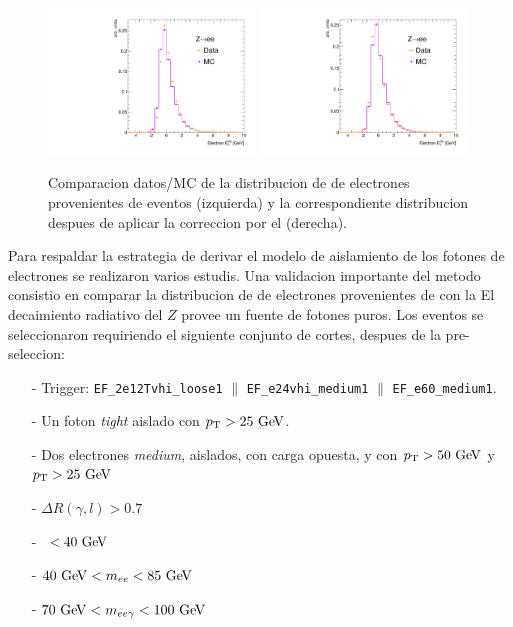 \begin{figure}[h]
  \centering
  \includegraphics[width=0.49\textwidth]{figures/electron_iso_Zee_raw}
  \includegraphics[width=0.49\textwidth]{figures/electron_iso_Zee_corr}
  \caption{Comparacion datos/MC de la distribucion de {\etiso} de electrones provenientes de
    eventos {\Zee} (izquierda) y la correspondiente distribucion despues de aplicar la correccion
    por el {\pt} (derecha).}
  \label{fig:isolation_wandwo_correction}
\end{figure}

Para respaldar la estrategia de derivar el modelo de aislamiento de los fotones de
electrones se realizaron varios estudis. Una validacion importante del metodo consistio
en comparar la distribucion de {\etiso} de electrones provenientes de {\Zee} con la
El decaimiento radiativo del $Z$ provee un fuente de fotones puros. Los eventos se
seleccionaron requiriendo el siguiente conjunto de cortes, despues de la pre-seleccion:

\begin{itemize}\itemsep0.1cm
\item[-] Trigger: \texttt{EF\_2e12Tvhi\_loose1} $\parallel$ \texttt{EF\_e24vhi\_medium1} $\parallel$ \texttt{EF\_e60\_medium1}.
\item[-] Un foton \emph{tight} aislado con $\pt>25 \gev$.
\item[-] Dos electrones \emph{medium}, aislados, con carga opuesta, y con $\pt>50 \gev$ y $\pt>25 \gev$
\item[-] $\Delta R(\gamma,l)>0.7$
\item[-] \MET\ $<40\gev$
\item[-] $40\gev<m_{ee}<85\gev$
\item[-] $70\gev<m_{ee\gamma}<100\gev$
\end{itemize}

